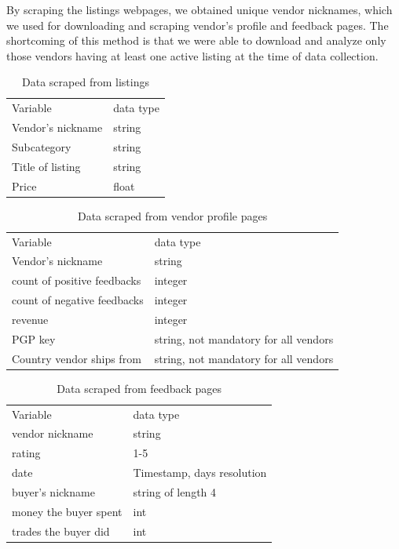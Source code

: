 \documentclass[
  digital, %
  table,   %
  lof,     %
  lot,     %
  oneside
]{fithesis3}
\begin{document}
By scraping the listings webpages, we obtained unique vendor nicknames,
which we used for downloading and scraping vendor's profile and feedback pages.
The shortcoming of this method is that we were able to download and analyze only those vendors
having at least one active listing at the time of data collection. 


\begin{table}
    \caption{Data scraped from listings}
    \label{datalist}
    \begin{tabular}{|l|l|}
 Variable & data type\\
 Vendor's nickname & string\\
 Subcategory & string\\
 Title of listing & string\\
 Price & float\\
    \end{tabular}
\end{table}

\begin{table}
    \caption{Data scraped from vendor profile pages}
    \label{datavendor}
    \begin{tabular}{|l|l|}
Variable & data type\\
Vendor's nickname & string\\
count of positive feedbacks & integer\\
count of negative feedbacks & integer\\
revenue & integer \\
PGP key & string, not mandatory for all vendors\\
Country vendor ships from & string, not mandatory for all vendors\\
    \end{tabular}
\end{table}

\begin{table}
    \caption{Data scraped from feedback pages}
    \label{datafeedback}
    \begin{tabular}{|l|l|}
 Variable & data type\\
vendor nickname & string\\
rating & 1-5\\
date & Timestamp, days resolution\\
buyer's nickname & string of length 4\\
money the buyer spent & int\\
trades the buyer did & int\\
   
    \end{tabular}
\end{table}
\end{document}
